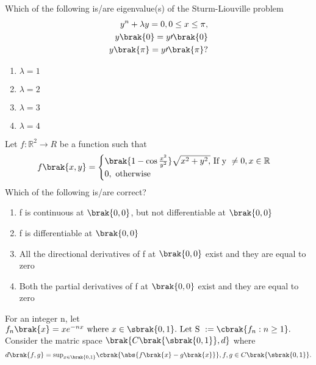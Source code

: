 \iffalse
\chapter{2024}
\author{AI24BTECH11032}
\section{ma}
\fi
\item Which of the following is/are eigenvalue(s) of the Sturm-Liouville problem 
\begin{align*}
    y^{n}+\lambda y=0, 0\leq x\leq \pi,\\
    y\brak{0}=y\prime\brak{0}\\
    y\brak{\pi}=y\prime\brak{\pi}?
\end{align*}
\begin{enumerate}
    \item $\lambda=1$
    \item $\lambda=2$
    \item $\lambda=3$
    \item $\lambda=4$
\end{enumerate}
\bigskip
\item Let $f:\mathbb{R}^{2}\to R$ be a function such that 
\begin{align*}
    f\brak{x,y}=
    \begin{cases}
        \brak{1-\cos\frac{x^{2}}{y^{2}}}\sqrt{x^{2}+y^{2},} \text{ If y }\neq 0,x\in\mathbb{R}\\
        0, \text{ otherwise }
    \end{cases}
\end{align*}
Which of the following is/are correct?
\begin{enumerate}
    \item f is continuous at $\brak{0, 0}$, but not differentiable at $\brak{0, 0}$
    \item f is differentiable at $\brak{0, 0}$
    \item All the directional derivatives of f at $\brak{0, 0}$ exist and they are equal to zero
    \item Both the partial derivatives of f at $\brak{0, 0}$ exist and they are equal to zero
\end{enumerate}
\bigskip
\item For an integer n, let $f_{n}\brak{x}=xe^{-nx}\text{ where } x\in\sbrak{0,1}.\text{ Let S }:=\cbrak{f_{n}:n\geq1}.$ Consider the matric space $\brak{C\brak{\sbrak{0,1}},d} $ where 
\begin{align*}
    d\brak{f,g}=\text{sup}_{x\in\brak{0,1}}\cbrak{\abs{f\brak{x}-g\brak{x}}}, f,g\in C\brak{\sbrak{0,1}}.
\end{align*}
